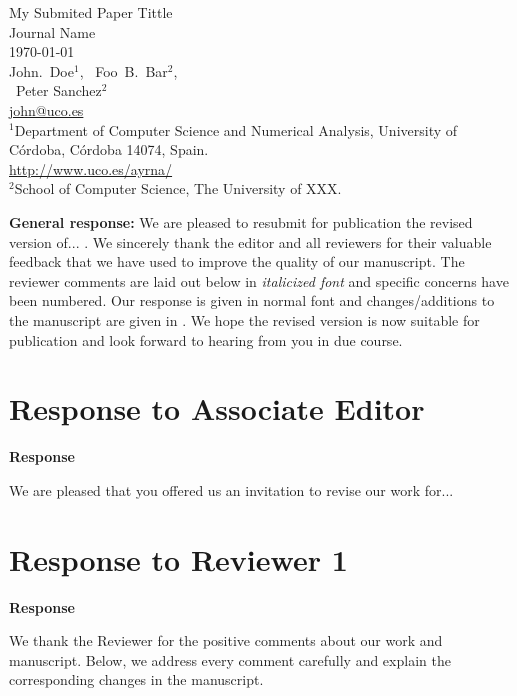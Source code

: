 \documentclass[a4paper,twoside,11pt]{reviewresponse}
\makeatletter
\newcommand{\myAuthors}{{John.~Doe$^{\displaystyle 1}$, ~Foo~B.~Bar$^{\displaystyle 2}$, } \\ {~Peter Sanchez$^{\displaystyle 2}$}}
\newcommand{\myEmail}{john@uco.es}
\newcommand{\myTitle}{My Submited Paper Tittle}
\newcommand{\myJournal}{Journal Name}
\newcommand{\myDept}{{$^{\displaystyle 1}$Department of Computer Science and Numerical Analysis, University of C\'{o}rdoba, C\'{o}rdoba 14074, Spain. \\ \url{http://www.uco.es/ayrna/}}\\
{$^{\displaystyle 2}$School of Computer Science, The University of XXX. }\\}
\makeatother
\begin{document}
\thispagestyle{plain}

\begin{center}
 {\LARGE\myTitle} \vspace{0.5cm} \\
 {\large\myJournal} \vspace{0.5cm} \\
 \today \vspace{0.5cm} \\
 \myAuthors \\
 \url{\myEmail} \vspace{1cm} \\
 \myDept
\end{center}

 \textbf{General response:} We are pleased to resubmit for publication the revised version of... . We sincerely thank the editor and all reviewers for their valuable feedback that we have used to improve the quality of our manuscript. The reviewer comments are laid out below in \textit{italicized font} and specific concerns have been numbered. Our response is given in normal font and changes/additions to the manuscript are given in . We hope the revised version is now suitable for publication and look forward to hearing from you in due course.

\tableofcontents



\section{Response to Associate Editor}


\textbf{Response}

We are pleased that you offered us an invitation to revise our work for...

\section{Response to Reviewer 1}


\textbf{Response}

We thank the Reviewer for the positive comments about our work and manuscript. Below, we address every comment carefully and explain the corresponding changes in the manuscript.

\end{document}
